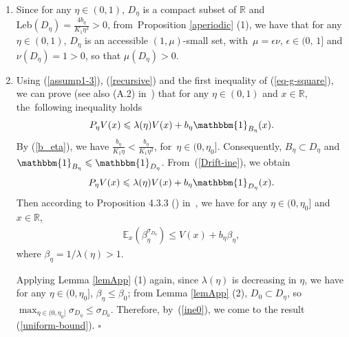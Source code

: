 \documentclass[11pt]{elsarticle}
\newcommand{\rmnum}[1]{\romannumeral #1}
\def\leq{\leqslant}
\def\E{\mathbb{E}}
\def\R{\mathbb{R}}
\begin{document}
\begin{pf}
	\begin{enumerate}
		\item[(1)] Since for any $\eta\in(0,1)$, $D_{\eta}$ is a compact subset of $\R$ and $\mbox{Leb}(D_{\eta})=\frac{4b_{\eta}}{K_1\eta^2}>0$, from~Proposition \ref{aperiodic} (1), we have that for any $\eta\in(0,1)$, $D_{\eta}$ is an accessible $(1,\mu)$-small set, with~$\mu=\epsilon\nu$, $\epsilon\in(0,\,1]$ and $\nu(D_{\eta})=1>0$, so that $\mu(D_{\eta})>0$.
		\item[(2)] Using (\ref{assump1-3}), (\ref{recursive}) and the first inequality of (\ref{eq-g-square}), we can prove (see also (A.2) in~\cite{LTX22}) that for any $\eta\in(0,1)$ and $x\in\R$, the~following inequality holds
		\begin{equation}\label{Drift-ine}
			P_{\eta}V(x)\leq\lambda(\eta) V(x)+b_{\eta}\mathbbm{1}_{B_{\eta}}(x).
		\end{equation}
		By (\ref{b_eta}), we have $\frac{b_\eta}{K_1\eta}<\frac{b_\eta}{K_1\eta^2}$, for~$\eta\in(0,\eta_0]$. Consequently, $B_\eta\subset D_\eta$ and $\mathbbm{1}_{B_\eta}\leq\mathbbm{1}_{D_\eta}$. From~(\ref{Drift-ine}), we obtain
		$$P_{\eta}V(x)\leq\lambda(\eta) V(x)+b_{\eta}\mathbbm{1}_{D_{\eta}}(x).$$
		Then according to {Proposition 4.3.3} (\rmnum{2}) in~\cite{DMPS18}, we have for any  $\eta\in(0,\eta_0]$ and $x\in \R$,
		\begin{align}\label{ine0}
			\E_x\left(\beta_{\eta}^{\sigma_{D_\eta}}\right)\leq V(x)+b_{\eta}\beta_{\eta},
		\end{align}
		where $\beta_{\eta}=1/\lambda(\eta)>1$.
		
		Applying Lemma \ref{lemApp} (1) again, since $\lambda(\eta)$ is decreasing in $\eta$, we have for any $\eta\in(0,\eta_0]$, $\beta_\eta\leq \beta_0$; from Lemma \ref{lemApp} (2), $D_{0}\subset D_{\eta}$, so \mbox{$\displaystyle\max_{\eta\in(0,\eta_0]}\sigma_{D_\eta}\leq \sigma_{D_0}$}. Therefore, by~(\ref{ine0}), we come to the result (\ref{uniform-bound}). \hfill$\square$
	\end{enumerate}
\end{pf}
\end{document}
